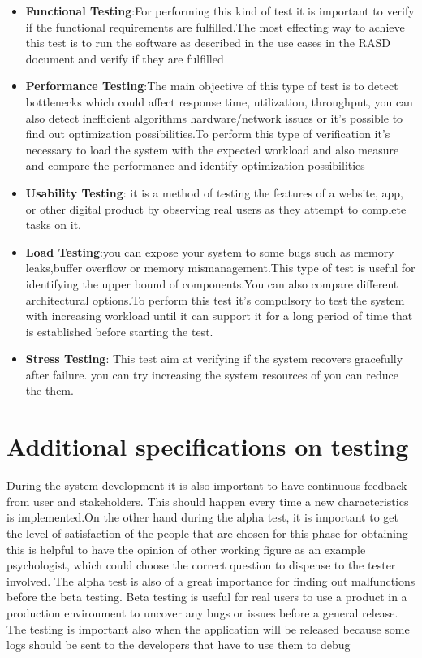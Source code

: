 \begin{itemize}
    \item \textbf{Functional Testing}:For performing this kind of test it is important to verify if the functional requirements are fulfilled.The most effecting way to achieve this test is to run the software as described in the use cases in the RASD document and verify if they are fulfilled
    \item \textbf{Performance Testing}:The main objective of this type of test is to detect bottlenecks which could affect response time, utilization, throughput, you can also detect inefficient algorithms hardware/network issues or it's possible to find out optimization possibilities.To perform this type of verification it's necessary to load the system with the expected workload and also measure and compare the performance and identify optimization possibilities
    \item \textbf{Usability Testing}: it  is a method of testing the features of a website, app, or other digital product by observing real users as they attempt to complete tasks on it.
    \item \textbf{Load Testing}:you can expose your system to some bugs such as memory leaks,buffer overflow or memory mismanagement.This type of test is useful for identifying the upper bound of components.You can also compare different architectural options.To perform this test it's compulsory to test the system with increasing workload until it can support it for a long period of time that is established before starting the test.
    \item \textbf{Stress Testing}: This test aim at verifying if the system recovers gracefully after failure. you can try increasing the system resources of you can reduce the them.
    
\end{itemize}

\pagebreak
\section{Additional specifications on testing}
During the system development it is also important to have continuous feedback from user and stakeholders.
This should happen every time a new characteristics is implemented.On the other hand during the alpha test, it is important to get the level of satisfaction of the people that are chosen for this phase for obtaining this is helpful to have the opinion of other working figure as an example psychologist, which could choose the correct question to dispense to the tester involved.  
The alpha test is also of a great importance for finding out malfunctions before the beta testing.
Beta testing is useful for real users to use a product in a production environment to uncover any bugs or issues before a general release.
The testing is important also when the application will be released because some logs should be sent to the developers that have to use them to debug

